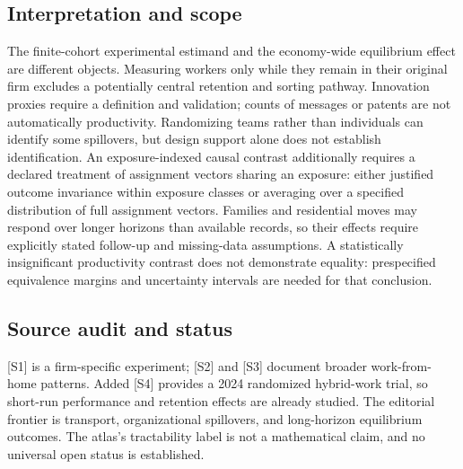 \documentclass[11pt,a4paper]{article}
\begin{document}
\subsection*{Interpretation and scope}
The finite-cohort experimental estimand and the economy-wide equilibrium effect are different objects. Measuring workers only while they remain in their original firm excludes a potentially central retention and sorting pathway. Innovation proxies require a definition and validation; counts of messages or patents are not automatically productivity. Randomizing teams rather than individuals can identify some spillovers, but design support alone does not establish identification. An exposure-indexed causal contrast additionally requires a declared treatment of assignment vectors sharing an exposure: either justified outcome invariance within exposure classes or averaging over a specified distribution of full assignment vectors. Families and residential moves may respond over longer horizons than available records, so their effects require explicitly stated follow-up and missing-data assumptions. A statistically insignificant productivity contrast does not demonstrate equality: prespecified equivalence margins and uncertainty intervals are needed for that conclusion.
\subsection*{Source audit and status}
[S1] is a firm-specific experiment; [S2] and [S3] document broader work-from-home patterns. Added [S4] provides a 2024 randomized hybrid-work trial, so short-run performance and retention effects are already studied. The editorial frontier is transport, organizational spillovers, and long-horizon equilibrium outcomes. The atlas's tractability label is not a mathematical claim, and no universal open status is established.
\end{document}
